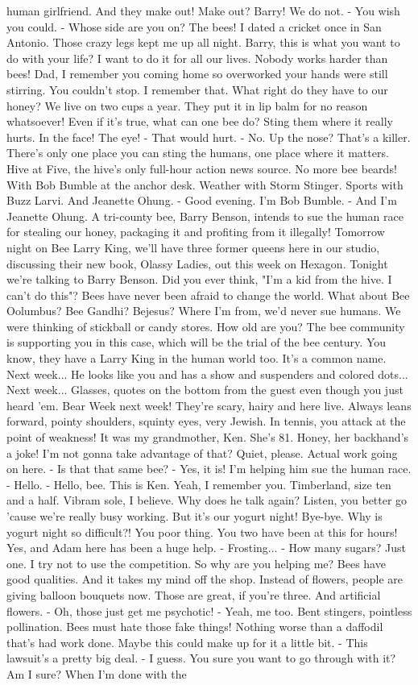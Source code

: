 \documentclass{article}
\begin{document}
human girlfriend. And they make out! Make out? Barry! We do not. - You wish you could. - Whose side are you on? The bees! I dated a cricket once in San Antonio. Those crazy legs kept me up all night. Barry, this is what you want to do with your life? I want to do it for all our lives. Nobody works harder than bees! Dad, I remember you coming home so overworked your hands were still stirring. You couldn't stop. I remember that. What right do they have to our honey? We live on two cups a year. They put it in lip balm for no reason whatsoever! Even if it's true, what can one bee do? Sting them where it really hurts. In the face! The eye! - That would hurt. - No. Up the nose? That's a killer. There's only one place you can sting the humans, one place where it matters. Hive at Five, the hive's only full-hour action news source. No more bee beards! With Bob Bumble at the anchor desk. Weather with Storm Stinger. Sports with Buzz Larvi. And Jeanette Ohung. - Good evening. I'm Bob Bumble. - And I'm Jeanette Ohung. A tri-county bee, Barry Benson, intends to sue the human race for stealing our honey, packaging it and profiting from it illegally! Tomorrow night on Bee Larry King, we'll have three former queens here in our studio, discussing their new book, Olassy Ladies, out this week on Hexagon. Tonight we're talking to Barry Benson. Did you ever think, "I'm a kid from the hive. I can't do this"? Bees have never been afraid to change the world. What about Bee Oolumbus? Bee Gandhi? Bejesus? Where I'm from, we'd never sue humans. We were thinking of stickball or candy stores. How old are you? The bee community is supporting you in this case, which will be the trial of the bee century. You know, they have a Larry King in the human world too. It's a common name. Next week... He looks like you and has a show and suspenders and colored dots... Next week... Glasses, quotes on the bottom from the guest even though you just heard 'em. Bear Week next week! They're scary, hairy and here live. Always leans forward, pointy shoulders, squinty eyes, very Jewish. In tennis, you attack at the point of weakness! It was my grandmother, Ken. She's 81. Honey, her backhand's a joke! I'm not gonna take advantage of that? Quiet, please. Actual work going on here. - Is that that same bee? - Yes, it is! I'm helping him sue the human race. - Hello. - Hello, bee. This is Ken. Yeah, I remember you. Timberland, size ten and a half. Vibram sole, I believe. Why does he talk again? Listen, you better go 'cause we're really busy working. But it's our yogurt night! Bye-bye. Why is yogurt night so difficult?! You poor thing. You two have been at this for hours! Yes, and Adam here has been a huge help. - Frosting... - How many sugars? Just one. I try not to use the competition. So why are you helping me? Bees have good qualities. And it takes my mind off the shop. Instead of flowers, people are giving balloon bouquets now. Those are great, if you're three. And artificial flowers. - Oh, those just get me psychotic! - Yeah, me too. Bent stingers, pointless pollination. Bees must hate those fake things! Nothing worse than a daffodil that's had work done. Maybe this could make up for it a little bit. - This lawsuit's a pretty big deal. - I guess. You sure you want to go through with it? Am I sure? When I'm done with the 
\end{document}
